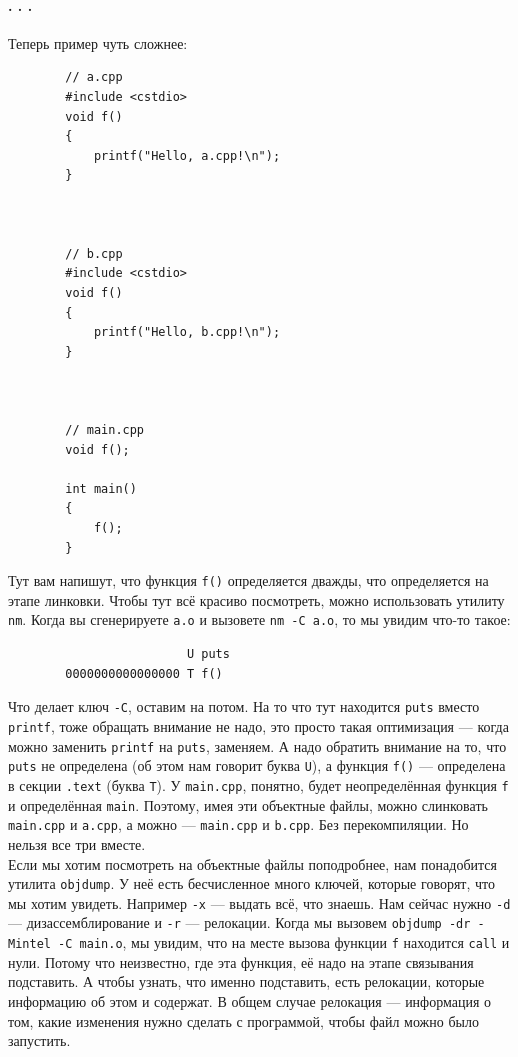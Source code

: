 \documentclass{article}
\newcommand{\asm}[1]{\texttt{#1}}
\begin{document}
    \paragraph{. . .}
    Теперь пример чуть сложнее:
    \begin{verbatim}
        // a.cpp
        #include <cstdio>
        void f()
        {
            printf("Hello, a.cpp!\n");
        }



        // b.cpp
        #include <cstdio>
        void f()
        {
            printf("Hello, b.cpp!\n");
        }



        // main.cpp
        void f();

        int main()
        {
            f();
        }
    \end{verbatim}
    Тут вам напишут, что функция \texttt{f()} определяется дважды, что определяется на этапе линковки. Чтобы тут всё красиво посмотреть, можно использовать утилиту \texttt{nm}. Когда вы сгенерируете \texttt{a.o} и вызовете \texttt{nm -C a.o}, то мы увидим что-то такое:
    \begin{verbatim}
                         U puts
        0000000000000000 T f()
    \end{verbatim}
    Что делает ключ \texttt{-C}, оставим на потом. На то что тут находится \texttt{puts} вместо \texttt{printf}, тоже обращать внимание не надо, это просто такая оптимизация --- когда можно заменить \texttt{printf} на \texttt{puts}, заменяем. А надо обратить внимание на то, что \texttt{puts} не определена (об этом нам говорит буква \texttt{U}), а функция \texttt{f()} --- определена в секции \asm{.text} (буква \texttt{T}). У \texttt{main.cpp}, понятно, будет неопределённая функция \texttt{f} и определённая \texttt{main}.
    Поэтому, имея эти объектные файлы, можно слинковать \texttt{main.cpp} и \texttt{a.cpp}, а можно --- \texttt{main.cpp} и \texttt{b.cpp}. Без перекомпиляции. Но нельзя все три вместе.\\
    Если мы хотим посмотреть на объектные файлы поподробнее, нам понадобится утилита \texttt{objdump}. У неё есть бесчисленное много ключей, которые говорят, что мы хотим увидеть. Например \texttt{-x} --- выдать всё, что знаешь. Нам сейчас нужно \texttt{-d} --- дизассемблирование и \texttt{-r} --- релокации. Когда мы вызовем \texttt{objdump -dr -Mintel -C main.o}, мы увидим, что на месте вызова функции \texttt{f} находится \asm{call} и нули. Потому что неизвестно, где эта функция, её надо на этапе связывания подставить. А чтобы узнать, что именно подставить, есть релокации, которые информацию об этом и содержат. В общем случае релокация --- информация о том, какие изменения нужно сделать с программой, чтобы файл можно было запустить.\\
\end{document}
